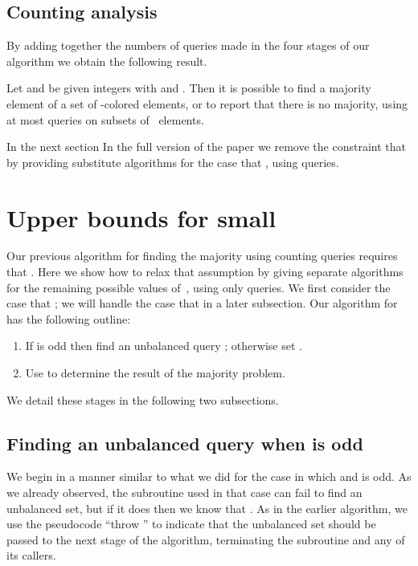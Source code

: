 \documentclass[11pt]{llncs}
\begin{document}
\subsection{Counting analysis}

By adding together the numbers of queries made in the four stages of our algorithm we obtain the following result.

\begin{theorem}
Let  and  be given integers with  and . Then it is possible to find a majority element of a set of  -colored elements, or to report that there is no majority, using at most   queries on subsets of~ elements.
\end{theorem}

\ifFull
In the next section
\else
In the full version of the paper
\fi
we remove the constraint that  by providing substitute algorithms for the case that , using  queries.

\ifFull
\section{Upper bounds for small }

Our previous algorithm for finding the majority using counting queries requires that .
Here we show how to relax that assumption by giving separate algorithms for the remaining possible values of~, using only  queries. We first consider the case that ; we will handle the case that  in a later subsection.
Our  algorithm for  has the following outline:
\begin{enumerate}
\item If  is odd then find an unbalanced query ; otherwise set .
\item Use  to determine the result of the majority problem.
\end{enumerate}
We detail these stages in the following two subsections.

\subsection{Finding an unbalanced query when  is odd}

We begin in a manner similar to what we did for the case in which  and  is odd.
As we already observed, the subroutine  used in that case can fail to find an unbalanced set, but if it does then we know that . As in the earlier algorithm, we use the pseudocode ``throw '' to indicate that the unbalanced set  should be passed to the next stage of the algorithm, terminating the subroutine and any of its callers.
\end{document}
